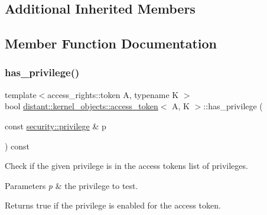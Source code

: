 \subsection*{Additional Inherited Members}


\subsection{Member Function Documentation}
\mbox{\label{classdistant_1_1kernel__objects_1_1access__token_a6509ad02d8454898bdd591c6a70f55d5}} 
\subsubsection{\texorpdfstring{has\+\_\+privilege()}{has\_privilege()}}
{\footnotesize\ttfamily template$<$access\+\_\+rights\+::token A, typename K $>$ \\
bool \mbox{\hyperlink{classdistant_1_1kernel__objects_1_1access__token}{distant\+::kernel\+\_\+objects\+::access\+\_\+token}}$<$ A, K $>$\+::has\+\_\+privilege (\begin{DoxyParamCaption}\item[{const \mbox{\hyperlink{classdistant_1_1security_1_1privilege}{security\+::privilege}} \&}]{p }\end{DoxyParamCaption}) const\hspace{0.3cm}{\ttfamily [noexcept]}}

Check if the given privilege is in the access token\textquotesingle{}s list of privileges. 
\begin{DoxyParams}{Parameters}
{\em p} & the privilege to test. \\
\hline
\end{DoxyParams}
\begin{DoxyReturn}{Returns}
true if the privilege is enabled for the access token. 
\end{DoxyReturn}
\mbox{\label{classdistant_1_1kernel__objects_1_1access__token_aa396b0b32bd1f9aba79320a5104e0289}} 
